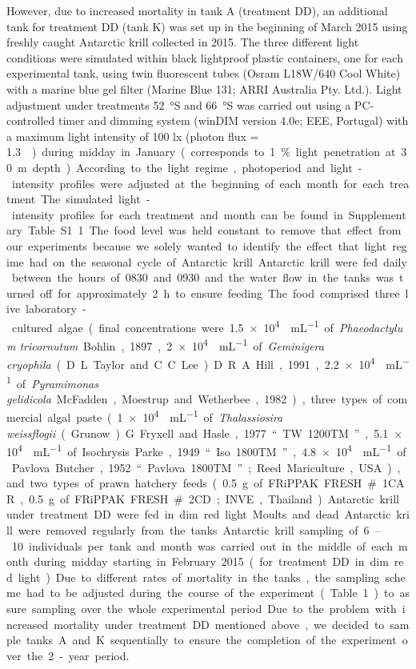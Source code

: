 However, due to increased mortality in tank A (treatment DD), an additional
tank for treatment DD (tank K) was set up in the beginning of March 2015 using
freshly caught Antarctic krill collected in 2015. The three different light
conditions were simulated within black lightproof plastic containers, one for
each experimental tank, using twin fluorescent tubes (Osram L18W/640 Cool
White) with a marine blue gel filter (Marine Blue 131; ARRI Australia Pty.
Ltd.). Light adjustment under treatments \SI{52}{\degree}S and
\SI{66}{\degree}S was carried out using a PC-controlled timer and dimming
system (winDIM version 4.0e; EEE, Portugal) with a maximum light intensity of
100 lx (photon flux = \SI{1.3}{\micro\mole\per\meter\square\per\second}) during
midday in January (corresponds to 1\% light penetration at \SI{30}{\meter}
depth).  According to the light regime, photoperiod and light-intensity
profiles were adjusted at the beginning of each month for each treatment. The
simulated light-intensity profiles for each treatment and month can be found in
Supplementary Table S1.1 

The food level was held constant to remove that effect from our experiments
because we solely wanted to identify the effect that light regime had on the
seasonal cycle of Antarctic krill. Antarctic krill were fed daily between the
hours of 0830 and 0930 and the water flow in the tanks was turned off for
approximately 2 h to ensure feeding. The food comprised three live
laboratory-cultured algae (final concentrations were
\SI{1.5e4}{\cells\per\milli\liter} of \textit{Phaeodactylum tricornutum} Bohlin, 1897,
\SI{2e4}{\cells\per\milli\liter} of \textit{Geminigera cryophila} (D.L. Taylor and C.C.
Lee) D.R.A. Hill, 1991, \SI{2.2e4}{\cells\per\milli\liter} of \textit{Pyramimonas
gelidicola} McFadden, Moestrup and Wetherbee, 1982), three types of commercial
algal paste (\SI{1e4}{\cells\per\milli\liter} of \textit{Thalassiosira
weissflogii} (Grunow) G. Fryxell and Hasle, 1977 “TW 1200TM”,
\SI{5.1e4}{\cells\per\milli\liter} of Isochrysis Parke, 1949 “Iso 1800TM”,
\SI{4.8e4}{\cells\per\milli\liter} of Pavlova Butcher, 1952 “Pavlova 1800TM”;
Reed Mariculture, USA), and two types of prawn hatchery feeds (\SI{0.5}{\gram}
of FRiPPAK FRESH \#1CAR, \SI{0.5}{\gram} of FRiPPAK FRESH \#2CD; INVE, Thailand).
Antarctic krill under treatment DD were fed in dim red light. Moults and dead
Antarctic krill were removed regularly from the tanks. 

Antarctic krill sampling of 6–10 individuals per tank and month was carried out
in the middle of each month during midday starting in February 2015 (for
treatment DD in dim red light). Due to different rates of mortality in the
tanks, the sampling scheme had to be adjusted during the course of the
experiment (Table 1) to assure sampling over the whole experimental period. Due
to the problem with increased mortality under treatment DD mentioned above, we
decided to sample tanks A and K sequentially to ensure the completion of the
experiment over the 2-year period. 

